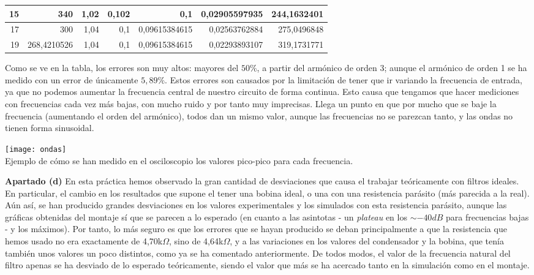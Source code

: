 \documentclass{article}
\begin{document}
\begin{table}[h]
\begin{tabular}{|r|r|r|r|r|r|r|}
15                                           & 340                                             & 1,02                          & 0,102                            & 0,1                        & 0,02905597935                                & 244,1632401                     \\ \hline
17                                           & 300                                             & 1,04                          & 0,1                              & 0,09615384615              & 0,02563762884                                & 275,0496848                     \\ \hline
19                                           & 268,4210526                                     & 1,04                          & 0,1                              & 0,09615384615              & 0,02293893107                                & 319,1731771                     \\ \hline
\end{tabular}
\end{table}

Como se ve en la tabla, los errores son muy altos: mayores del $50\%$, a partir del armónico de orden 3; aunque el armónico de orden 1 se ha medido con un error de únicamente $5,89\%$. 
Estos errores son causados por la limitación de tener que ir variando la frecuencia de entrada, ya que no podemos aumentar la frecuencia central de nuestro circuito de forma continua. Esto causa que tengamos que hacer mediciones con frecuencias cada vez más bajas, con mucho ruido y por tanto muy imprecisas. Llega un punto en que por mucho que se baje la frecuencia (aumentando el orden del armónico), todos dan un mismo valor, aunque las frecuencias no se parezcan tanto, y las ondas no tienen forma sinusoidal.
\bigskip
\begin{center}
\texttt{[image: ondas]}\\
Ejemplo de cómo se han medido en el osciloscopio los valores pico-pico para cada frecuencia.
\end{center}

\textbf{Apartado (d)}
En esta práctica hemos observado la gran cantidad de desviaciones que causa el trabajar teóricamente con filtros ideales. En particular, el cambio en los resultados que supone el tener una bobina ideal, o una con una resistencia parásito (más parecida a la real). Aún así, se han producido grandes desviaciones en los valores experimentales y los simulados con esta resistencia parásito, aunque las gráficas obtenidas del montaje sí que se parecen a lo esperado (en cuanto a las asintotas - un \textit{plateau} en los $\sim -40dB$ para frecuencias bajas - y los máximos). Por tanto, lo más seguro es que los errores que se hayan producido se deban principalmente a que la resistencia que hemos usado no era exactamente de 4,70k$\Omega$, sino de 4,64k$\Omega$, y a las variaciones en los valores del condensador y la bobina, que tenía también unos valores un poco distintos, como ya se ha comentado anteriormente. De todos modos, el valor de la frecuencia natural del filtro apenas se ha desviado de lo esperado teóricamente, siendo el valor que más se ha acercado tanto en la simulación como en el montaje. 
\end{document}

